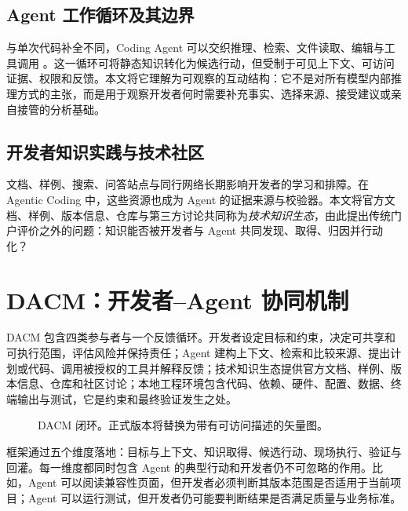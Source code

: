 \documentclass[manuscript,review,anonymous]{acmart}
\begin{document}
\subsection{Agent 工作循环及其边界}

与单次代码补全不同，Coding Agent 可以交织推理、检索、文件读取、编辑与工具调用 \cite{yao2023react,yang2024sweagent}。这一循环可将静态知识转化为候选行动，但受制于可见上下文、可访问证据、权限和反馈。本文将它理解为可观察的互动结构：它不是对所有模型内部推理方式的主张，而是用于观察开发者何时需要补充事实、选择来源、接受建议或亲自接管的分析基础。

\subsection{开发者知识实践与技术社区}

文档、样例、搜索、问答站点与同行网络长期影响开发者的学习和排障。在 Agentic Coding 中，这些资源也成为 Agent 的证据来源与校验器。本文将官方文档、样例、版本信息、仓库与第三方讨论共同称为\emph{技术知识生态}，由此提出传统门户评价之外的问题：知识能否被开发者与 Agent 共同发现、取得、归因并行动化？

\section{DACM：开发者--Agent 协同机制}

DACM 包含四类参与者与一个反馈循环。开发者设定目标和约束，决定可共享和可执行范围，评估风险并保持责任；Agent 建构上下文、检索和比较来源、提出计划或代码、调用被授权的工具并解释反馈；技术知识生态提供官方文档、样例、版本信息、仓库和社区讨论；本地工程环境包含代码、依赖、硬件、配置、数据、终端输出与测试，它是约束和最终验证发生之处。

\begin{figure}[t]
  \centering
  \caption{DACM 闭环。正式版本将替换为带有可访问描述的矢量图。}
  \label{fig:dacm-cn}
\end{figure}

框架通过五个维度落地：目标与上下文、知识取得、候选行动、现场执行、验证与回灌。每一维度都同时包含 Agent 的典型行动和开发者仍不可忽略的作用。比如，Agent 可以阅读兼容性页面，但开发者必须判断其版本范围是否适用于当前项目；Agent 可以运行测试，但开发者仍可能要判断结果是否满足质量与业务标准。
\end{document}
